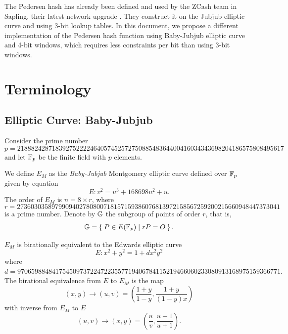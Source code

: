 \documentclass{article}
\begin{document}
\begin{spacing}{1.2}
The Pedersen hash has already been defined and used by the ZCash team in Sapling, their latest network upgrade \cite{sapling}. They construct it on the Jubjub elliptic curve and using 3-bit lookup tables. In this document, we propose a different implementation of the Pedersen hash function using Baby-Jubjub elliptic curve and 4-bit windows, which requires less constraints per bit than using 3-bit windows.

\section{Terminology}	

	\subsection{Elliptic Curve: Baby-Jubjub}
	
	Consider the prime number 
		$$	p = 21888242871839275222246405745257275088548364400416034343698204186575808495617 $$
	and let $\mathbb{F}_p$ be the finite field with $p$ elements. 
	
	We define $E_M$ as the {\it Baby-Jubjub} Montgomery elliptic curve defined over $\mathbb{F}_p$ given by equation
		$$	E: v^2 = u^3 +  168698u^2 + u. $$
	The order of $E_M$ is $n = 8\times r$, where 
		$$	r = 2736030358979909402780800718157159386076813972158567259200215660948447373041 $$ 
	is a prime number. Denote by $\mathbb{G}$ the subgroup of points of order $r$, that is, 
		$$\mathbb{G} = \Set{ P \in E(\ensuremath{\mathbb{F}_p}) | r P = O  }.$$
	
	$E_M$ is birationally equivalent to the Edwards elliptic curve 
		$$	E: x^2 + y^2 = 1 +  d x^2 y^2 $$
	where
		$ d = 9706598848417545097372247223557719406784115219466060233080913168975159366771.$ \\
	
	The birational equivalence \cite[Thm. 3.2]{twisted} from $E$ to $E_M$ is the map
		$$ (x,y) \to (u,v) = \left( \frac{1 + y}{1 - y} , \frac{1 + y}{(1 - y)x} \right) $$
	with inverse from $E_M$ to $E$
		$$ (u, v) \to (x, y) = \left(  \frac{u}{v}, \frac{u - 1}{u + 1}   \right). $$


\end{spacing}
\end{document}
